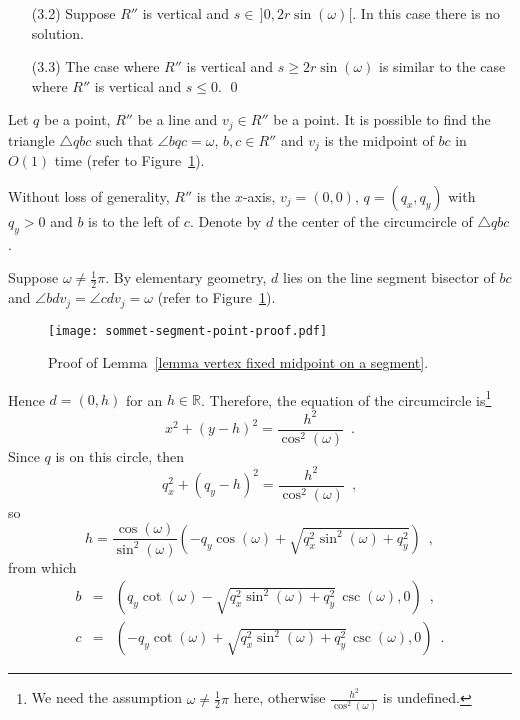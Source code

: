\documentclass[11pt, oneside]{article}
\begin{document}
\begin{enumerate}
\begin{enumerate}
\item[(3.2)] Suppose $R''$ is vertical and $s\in\,]0,2r\sin(\omega)[$.
In this case there is no solution.

\item[(3.3)] The case where $R''$ is vertical and $s\geq 2r\sin(\omega)$
is similar to the case where $R''$ is vertical and $s\leq 0$.
\qed
\end{enumerate}
\end{enumerate}


\begin{lemma}
\label{lemma vertex fixed midpoint on a segment}
Let $q$ be a point,
$R''$ be a line
and $v_j \in R''$ be a point.
It is possible to find the triangle $\triangle qbc$
such that $\angle bqc=\omega$,
$b,c\in R''$
and $v_j$ is the midpoint of $bc$
in $O(1)$ time
(refer to Figure~\ref{sommet-segment-point-proof}).
\end{lemma}

\proof
Without loss of generality,
$R''$ is the $x$-axis,
$v_j=(0,0)$,
$q= \left(q_x,q_y\right)$ with $q_y>0$
and $b$ is to the left of $c$.
Denote by $d$
the center of the circumcircle of $\triangle qbc$.

Suppose $\omega\neq\frac{1}{2}\pi$.
By elementary geometry,
$d$ lies on the line segment bisector of $bc$
and $\angle bdv_j = \angle cdv_j = \omega$
(refer to Figure~\ref{sommet-segment-point-proof}).
\begin{figure}
\centering
\texttt{[image: sommet-segment-point-proof.pdf]}
\caption{Proof of Lemma~\ref{lemma vertex fixed midpoint on a segment}.\label{sommet-segment-point-proof}}
\end{figure}
Hence $d=(0,h)$ for an $h\in\mathbb{R}$.
Therefore,
the equation of the circumcircle is\footnote{We need
the assumption $\omega\neq\frac{1}{2}\pi$ here,
otherwise $\frac{h^2}{\cos^2\!(\omega)}$ is undefined.}
$$x^2+(y-h)^2 = \frac{h^2}{\cos^2\!(\omega)} \enspace.$$
Since $q$ is on this circle,
then
$$q_x^2+\left(q_y-h\right)^2 = \frac{h^2}{\cos^2\!(\omega)} \enspace,$$
so
$$h=\frac{\cos(\omega)}{\sin^2\!(\omega)}\left(-q_y\cos(\omega)+\sqrt{q_x^2\sin^2\!(\omega)+q_y^2}\right) \enspace,$$
from which
\begin{eqnarray*}
b &=& \left(q_y\cot(\omega)-\sqrt{q_x^2\sin^2\!(\omega)+q_y^2}\,\csc(\omega),0\right) \enspace,\\
c &=& \left(-q_y\cot(\omega)+\sqrt{q_x^2\sin^2\!(\omega)+q_y^2}\,\csc(\omega),0\right) \enspace.
\end{eqnarray*}
\end{document}
